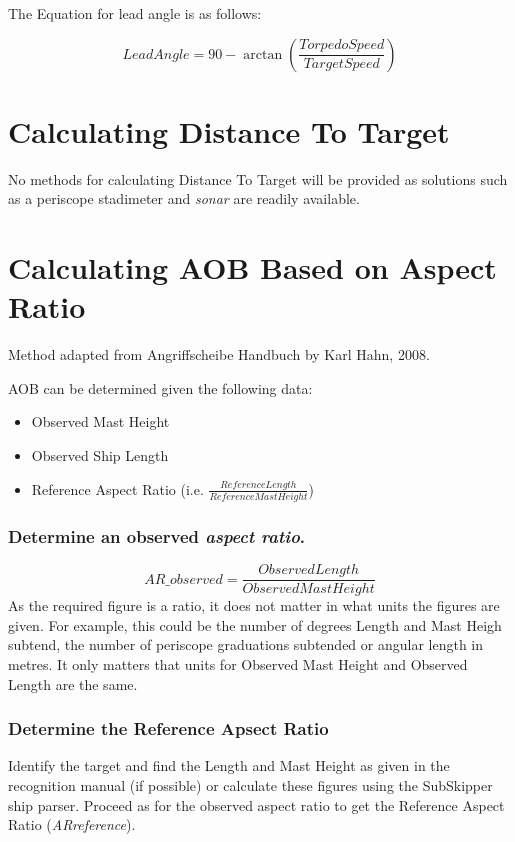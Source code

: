 \documentclass{article}
\begin{document}
The Equation for lead angle is as follows:

$$ LeadAngle = 90 - \arctan\left( \frac{Torpedo Speed}{TargetSpeed} \right) $$

\section{Calculating Distance To Target}

No methods for calculating Distance To Target will be provided as solutions such as a periscope stadimeter and \emph{sonar} are readily available.

\section{Calculating AOB Based on Aspect Ratio}

Method adapted from Angriffscheibe Handbuch by Karl Hahn, 2008.

AOB can be determined given the following data:
\begin{itemize}
\item{Observed Mast Height}
\item{Observed Ship Length}
\item{Reference Aspect Ratio (i.e. $\frac{Reference Length}{Reference Mast Height}$)}
\end{itemize}

\subsubsection{Determine an observed \emph{aspect ratio}.}
$$AR\_{observed} = \frac{Observed Length}{Observed Mast Height}$$
As the required figure is a ratio, it does not matter in what units the figures are given. For example, this could be the number of degrees Length and Mast Heigh subtend, the number of periscope graduations subtended or angular length in metres. It only matters that units for Observed Mast Height and Observed Length are the same.

\subsubsection{Determine the Reference Apsect Ratio}
Identify the target and find the Length and Mast Height as given in the recognition manual (if possible) or calculate these figures using the SubSkipper ship parser. Proceed as for the observed aspect ratio to get the Reference Aspect Ratio (\emph{ARreference}).
\end{document}
